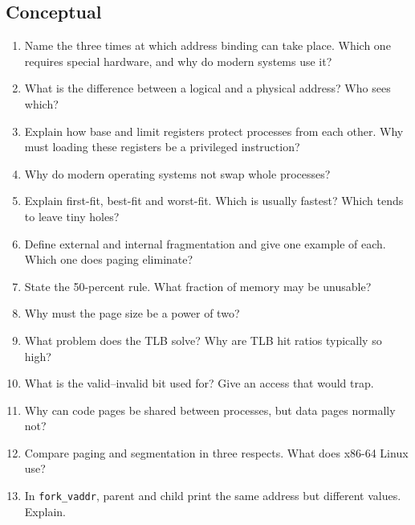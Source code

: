 \documentclass[11pt,a4paper]{article}
\newcommand{\cmd}[1]{\texttt{#1}}
\begin{document}
\subsection*{Conceptual}
\begin{enumerate}[leftmargin=1.6em]
  \item Name the three times at which address binding can take place. Which one requires special hardware, and why do modern systems use it?
  \item What is the difference between a logical and a physical address? Who sees which?
  \item Explain how base and limit registers protect processes from each other. Why must loading these registers be a privileged instruction?
  \item Why do modern operating systems not swap whole processes?
  \item Explain first-fit, best-fit and worst-fit. Which is usually fastest? Which tends to leave tiny holes?
  \item Define external and internal fragmentation and give one example of each. Which one does paging eliminate?
  \item State the 50-percent rule. What fraction of memory may be unusable?
  \item Why must the page size be a power of two?
  \item What problem does the TLB solve? Why are TLB hit ratios typically so high?
  \item What is the valid--invalid bit used for? Give an access that would trap.
  \item Why can code pages be shared between processes, but data pages normally not?
  \item Compare paging and segmentation in three respects. What does x86-64 Linux use?
  \item In \cmd{fork\_vaddr}, parent and child print the same address but different values. Explain.
\end{enumerate}
\end{document}
